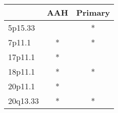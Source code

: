 \begin{tabular}{lcc}
\toprule
{} & AAH & Primary \\
\midrule
5p15.33  &     &       * \\
7p11.1   &   * &       * \\
17p11.1  &   * &         \\
18p11.1  &   * &       * \\
20p11.1  &   * &         \\
20q13.33 &   * &       * \\
\bottomrule
\end{tabular}

